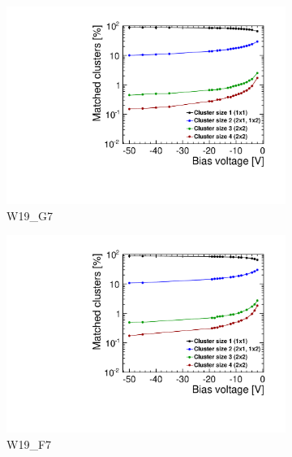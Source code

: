 \begin{figure}[htbp] \centering
  \begin{subfigure}[b]{0.33\textwidth}
    \includegraphics[width=\textwidth]{./figures/TestBeam/cluSize_biasScan_W0019_G07.pdf}
    \caption{W19\_G7}
  \end{subfigure} \hfill
  \begin{subfigure}[b]{0.33\textwidth}
    \includegraphics[width=\textwidth]{./figures/TestBeam/cluSize_biasScan_W0019_F07.pdf}
    \caption{W19\_F7}
  \end{subfigure}\hfill
  \begin{subfigure}[b]{0.33\textwidth}

\end{subfigure}
\end{figure}
